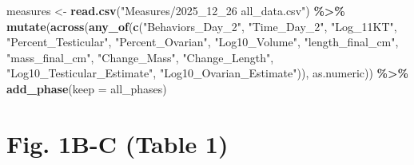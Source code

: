 \documentclass[
  landscape]{article}
\newenvironment{Shaded}{\begin{snugshade}}{\end{snugshade}}
\newcommand{\AttributeTok}[1]{\textcolor[rgb]{0.13,0.29,0.53}{#1}}
\newcommand{\FunctionTok}[1]{\textcolor[rgb]{0.13,0.29,0.53}{\textbf{#1}}}
\newcommand{\NormalTok}[1]{#1}
\newcommand{\OtherTok}[1]{\textcolor[rgb]{0.56,0.35,0.01}{#1}}
\newcommand{\SpecialCharTok}[1]{\textcolor[rgb]{0.81,0.36,0.00}{\textbf{#1}}}
\newcommand{\StringTok}[1]{\textcolor[rgb]{0.31,0.60,0.02}{#1}}
\begin{document}
\begin{Shaded}
\begin{Highlighting}[]
\NormalTok{measures }\OtherTok{\textless{}{-}} \FunctionTok{read.csv}\NormalTok{(}\StringTok{"Measures/2025\_12\_26 all\_data.csv"}\NormalTok{) }\SpecialCharTok{\%\textgreater{}\%}
  \FunctionTok{mutate}\NormalTok{(}\FunctionTok{across}\NormalTok{(}\FunctionTok{any\_of}\NormalTok{(}\FunctionTok{c}\NormalTok{(}\StringTok{"Behaviors\_Day\_2"}\NormalTok{, }\StringTok{"Time\_Day\_2"}\NormalTok{, }\StringTok{"Log\_11KT"}\NormalTok{, }\StringTok{"Percent\_Testicular"}\NormalTok{,}
                         \StringTok{"Percent\_Ovarian"}\NormalTok{, }\StringTok{"Log10\_Volume"}\NormalTok{, }\StringTok{"length\_final\_cm"}\NormalTok{, }\StringTok{"mass\_final\_cm"}\NormalTok{,}
                         \StringTok{"Change\_Mass"}\NormalTok{, }\StringTok{"Change\_Length"}\NormalTok{, }\StringTok{"Log10\_Testicular\_Estimate"}\NormalTok{,}
                         \StringTok{"Log10\_Ovarian\_Estimate"}\NormalTok{)), as.numeric)) }\SpecialCharTok{\%\textgreater{}\%}
  \FunctionTok{add\_phase}\NormalTok{(}\AttributeTok{keep =}\NormalTok{ all\_phases)}
\end{Highlighting}
\end{Shaded}

\section{Fig. 1B-C (Table 1)}\label{fig.-1b-c-table-1}
\end{document}
